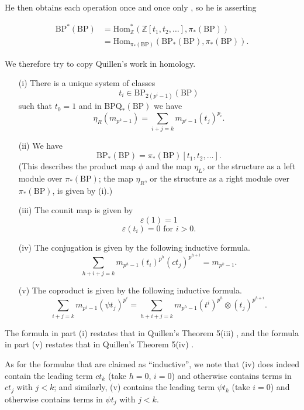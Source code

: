 \documentclass[../main]{subfiles}
\begin{document}
He then obtains each operation once and once only \cite[Theorem 5(i)]{quillen}, so he is asserting 

\begin{align*}
\mathrm {BP}^\ast(\mathrm {BP}) & = \mathrm{Hom}_{\mathbb Z}^\ast(\mathbb Z[t_1, t_2, \ldots], \pi_\ast(\mathrm{BP})) \\ & = \mathrm{Hom}_{\pi_\ast(\mathrm{BP})} (\mathrm{BP}_\ast(\mathrm{BP}), \pi_\ast(\mathrm {BP})).
\end{align*}

We therefore try to copy Quillen's work in homology. 

\begin{theorem}
\label{thm:p2c16.1}
\begin{enumerate}
    \item[(i)] There is a unique system of classes \[t_i \in \mathrm {BP}_{2(p^i - 1)} (\mathrm{BP})\] such that $t_0 = 1$ and in $\mathrm{BPQ}_\ast(\mathrm {BP})$ we have \[\eta_R (m_{p^k - 1}) = \sum_{i + j = k} m_{p^i - 1} (t_j)^{p_i}.\]
    \item[(ii)] We have \[\mathrm{BP}_\ast(\mathrm{BP}) = \pi_\ast(\mathrm{BP}) [t_1, t_2, \ldots].\] (This describes the product map $\phi$ and the map $\eta_L$, or the structure as a left module over $\pi_\ast(\mathrm{BP})$; the map $\eta_R$, or the structure as a right module over $\pi_\ast(\mathrm{BP})$, is given by (i).)
    \item[(iii)] The counit map is given by 
    \[\varepsilon(1) = 1\]
    \[\varepsilon(t_i) = 0 \text { for } i > 0.\]
    
    \item[(iv)] The conjugation is given by the following inductive formula. 
    \[\sum_{h + i + j = k} m_{p^h - 1} (t_i)^{p^h} (ct_j)^{p^{h + i}} = m_{p^k - 1}.\]
    
    \item[(v)] The coproduct is given by the following inductive formula. \[\sum_{i + j = k} m_{p^i - 1} (\psi t_j)^{p^i} = \sum_{h + i + j = k} m_{p^h - 1} (t^i)^{p^h} \otimes (t_j)^{p^{h + i}}.\] 
\end{enumerate}
\end{theorem}

The formula in part (i) restates that in Quillen's Theorem 5(iii) \cite{quillen}, and the formula in part (v) restates that in Quillen's Theorem 5(iv) \cite{quillen}. 

As for the formulae that are claimed as ``inductive'', we note that (iv) does indeed contain the leading term $c t_k$ (take $h = 0$, $i = 0$) and otherwise contains terms in $c t_j$ with $j < k$; and similarly, (v) contains the leading term $\psi t_k$ (take $i = 0$) and otherwise contains terms in $\psi t_j$ with $j < k$. 
\end{document}
